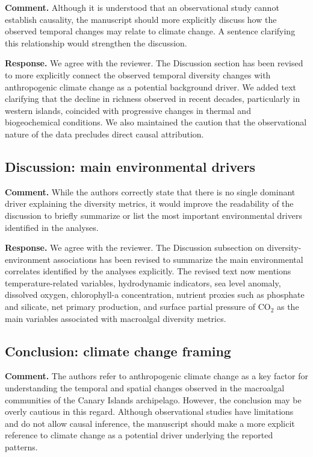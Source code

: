 \documentclass[12pt]{article}
\newcommand{\reviewercomment}[1]{%
\vspace{0.3em}
\noindent\textbf{Comment.} \textcolor{commentblue}{#1}\par
}
\newcommand{\authorresponse}[1]{%
\vspace{0.3em}
\noindent\textbf{Response.} \textcolor{responsegreen}{#1}\par
\vspace{0.8em}
}
\begin{document}
\reviewercomment{Although it is understood that an observational study cannot establish causality, the manuscript should more explicitly discuss how the observed temporal changes may relate to climate change. A sentence clarifying this relationship would strengthen the discussion.}

\authorresponse{We agree with the reviewer. The Discussion section has been revised to more explicitly connect the observed temporal diversity changes with anthropogenic climate change as a potential background driver. We added text clarifying that the decline in richness observed in recent decades, particularly in western islands, coincided with progressive changes in thermal and biogeochemical conditions. We also maintained the caution that the observational nature of the data precludes direct causal attribution.}

\subsection{Discussion: main environmental drivers}

\reviewercomment{While the authors correctly state that there is no single dominant driver explaining the diversity metrics, it would improve the readability of the discussion to briefly summarize or list the most important environmental drivers identified in the analyses.}

\authorresponse{We agree with the reviewer. The Discussion subsection on diversity-environment associations has been revised to summarize the main environmental correlates identified by the analyses explicitly. The revised text now mentions temperature-related variables, hydrodynamic indicators, sea level anomaly, dissolved oxygen, chlorophyll-a concentration, nutrient proxies such as phosphate and silicate, net primary production, and surface partial pressure of CO$_2$ as the main variables associated with macroalgal diversity metrics.}

\subsection{Conclusion: climate change framing}

\reviewercomment{The authors refer to anthropogenic climate change as a key factor for understanding the temporal and spatial changes observed in the macroalgal communities of the Canary Islands archipelago. However, the conclusion may be overly cautious in this regard. Although observational studies have limitations and do not allow causal inference, the manuscript should make a more explicit reference to climate change as a potential driver underlying the reported patterns.}
\end{document}
